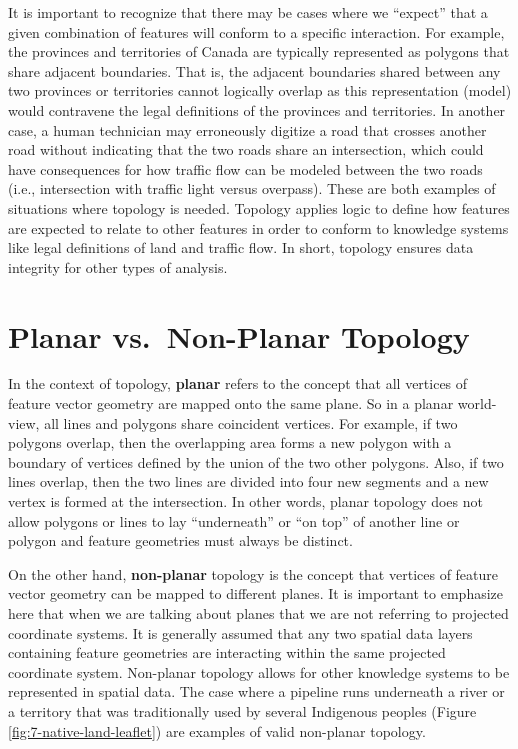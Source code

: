 \documentclass[
]{book}
\begin{document}
It is important to recognize that there may be cases where we ``expect'' that a given combination of features will conform to a specific interaction. For example, the provinces and territories of Canada are typically represented as polygons that share adjacent boundaries. That is, the adjacent boundaries shared between any two provinces or territories cannot logically overlap as this representation (model) would contravene the legal definitions of the provinces and territories. In another case, a human technician may erroneously digitize a road that crosses another road without indicating that the two roads share an intersection, which could have consequences for how traffic flow can be modeled between the two roads (i.e., intersection with traffic light versus overpass). These are both examples of situations where topology is needed. Topology applies logic to define how features are expected to relate to other features in order to conform to knowledge systems like legal definitions of land and traffic flow. In short, topology ensures data integrity for other types of analysis.

\hypertarget{planar-vs.-non-planar-topology}{%
\section{Planar vs.~Non-Planar Topology}\label{planar-vs.-non-planar-topology}}

In the context of topology, \textbf{planar} refers to the concept that all vertices of feature vector geometry are mapped onto the same plane. So in a planar world-view, all lines and polygons share coincident vertices. For example, if two polygons overlap, then the overlapping area forms a new polygon with a boundary of vertices defined by the union of the two other polygons. Also, if two lines overlap, then the two lines are divided into four new segments and a new vertex is formed at the intersection. In other words, planar topology does not allow polygons or lines to lay ``underneath'' or ``on top'' of another line or polygon and feature geometries must always be distinct.

On the other hand, \textbf{non-planar} topology is the concept that vertices of feature vector geometry can be mapped to different planes. It is important to emphasize here that when we are talking about planes that we are not referring to projected coordinate systems. It is generally assumed that any two spatial data layers containing feature geometries are interacting within the same projected coordinate system. Non-planar topology allows for other knowledge systems to be represented in spatial data. The case where a pipeline runs underneath a river or a territory that was traditionally used by several Indigenous peoples (Figure \ref{fig:7-native-land-leaflet}) are examples of valid non-planar topology.
\end{document}
